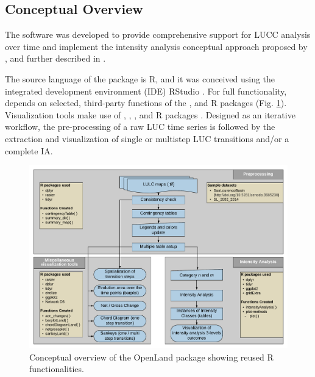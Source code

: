 \hypertarget{conceptual-overview}{%
\subsection{Conceptual Overview}\label{conceptual-overview}}

The software was developed to provide comprehensive support for LUCC
analysis over time and implement the intensity analysis conceptual
approach proposed by \citet{Aldwaik2012}, and further described in
\citet{Aldwaik2013}.

The source language of the  package \citep{Exavier2020} is R,
and it was conceived using the integrated development environment (IDE)
RStudio \citep{RStudioTeam2016}. For full functionality, 
depends on selected, third-party functions of the ,
 and  R packages
\citep{Hijmans2019, Wickham2019, Wickham2019a} (Fig.
\ref{fig:conception}). Visualization tools make use of ,
, ,  and
 R packages
\citep{Allaire2017, Auguie2017, Gu2014, Wickham2016}. Designed
as an iterative workflow, the pre-processing of a raw LUC time series is
followed by the extraction and visualization of single or multistep LUC
transitions and/or a complete IA.

\begin{Schunk}
\begin{figure}[h]

{\centering \includegraphics[width=0.8\linewidth,]{figures/conception_overview.pdf} 

}

\caption[Conceptual overview of the OpenLand package showing reused R functionalities]{Conceptual overview of the OpenLand package showing reused R functionalities.}\label{fig:conception}
\end{figure}
\end{Schunk}

